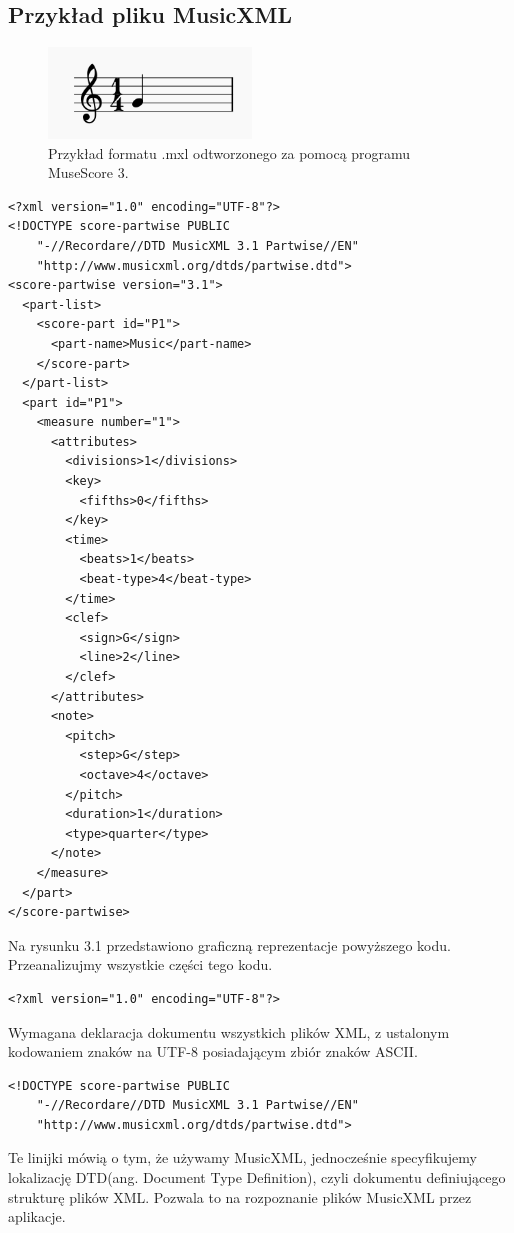 \documentclass[printmode, eng, openany]{mgr}
\newcommand\tab[1][1cm]{\hspace*{#1}}
\begin{document}
\subsection{Przykład pliku MusicXML}
\begin{figure}[!htb]
\centering
\includegraphics[width=5.4cm]{xml_example}
\caption{Przykład formatu .mxl odtworzonego za pomocą programu MuseScore 3.}
\end{figure}
\begin{lstlisting}
<?xml version="1.0" encoding="UTF-8"?>
<!DOCTYPE score-partwise PUBLIC
    "-//Recordare//DTD MusicXML 3.1 Partwise//EN"
    "http://www.musicxml.org/dtds/partwise.dtd">
<score-partwise version="3.1">
  <part-list>
    <score-part id="P1">
      <part-name>Music</part-name>
    </score-part>
  </part-list>
  <part id="P1">
    <measure number="1">
      <attributes>
        <divisions>1</divisions>
        <key>
          <fifths>0</fifths>
        </key>
        <time>
          <beats>1</beats>
          <beat-type>4</beat-type>
        </time>
        <clef>
          <sign>G</sign>
          <line>2</line>
        </clef>
      </attributes>
      <note>
        <pitch>
          <step>G</step>
          <octave>4</octave>
        </pitch>
        <duration>1</duration>
        <type>quarter</type>
      </note>
    </measure>
  </part>
</score-partwise>
\end{lstlisting}

\tab Na rysunku 3.1 przedstawiono graficzną reprezentacje powyższego kodu. Przeanalizujmy wszystkie części tego kodu.
 
\begin{lstlisting}
<?xml version="1.0" encoding="UTF-8"?>
\end{lstlisting}
Wymagana deklaracja dokumentu wszystkich plików XML, z ustalonym kodowaniem znaków na UTF-8 posiadającym zbiór znaków ASCII.

\begin{lstlisting}
<!DOCTYPE score-partwise PUBLIC
    "-//Recordare//DTD MusicXML 3.1 Partwise//EN"
    "http://www.musicxml.org/dtds/partwise.dtd">
\end{lstlisting}
Te linijki mówią o tym, że używamy MusicXML, jednocześnie specyfikujemy lokalizację DTD(ang. Document Type Definition), czyli dokumentu definiującego strukturę plików XML. Pozwala to na rozpoznanie plików MusicXML przez aplikacje.
\end{document}
